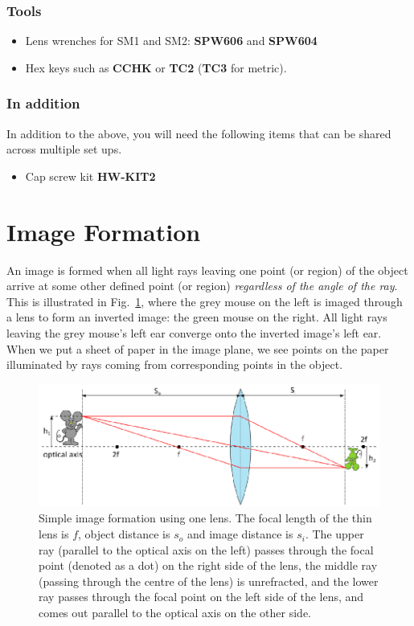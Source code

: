 \documentclass[a4paper]{report}
\begin{document}
\subsubsection{Tools}
\begin{itemize}
\setlength\itemsep{0.15em}
\item Lens wrenches for SM1 and SM2: \textbf{SPW606} and \textbf{SPW604}
\item Hex keys such as \textbf{CCHK} or \textbf{TC2} (\textbf{TC3} for metric). 
\end{itemize}

\subsubsection{In addition}
In addition to the above, you will need the following items that can be shared across multiple set ups.
\begin{itemize}
\setlength\itemsep{0.15em}
\item Cap screw kit \textbf{HW-KIT2}
\end{itemize}


\clearpage

\section{Image Formation}
An image is formed when all light rays leaving one point (or region) of the object arrive at some other defined point (or region) \textit{regardless of the angle of the ray}. 
This is illustrated in Fig.~\ref{fig:imageforming}, where the grey mouse on the left is imaged through a lens to form an inverted image: the green mouse on the right. 
All light rays leaving the grey mouse's left ear converge onto the inverted image's left ear. 
When we put a sheet of paper in the image plane, we see points on the paper illuminated by rays coming from corresponding points in the object. 



\begin{figure}[h]
\center
\includegraphics{image_forming_basics.eps}
\caption{Simple image formation using one lens. 
The focal length of the thin lens is $f$, object distance is $s_o$ and image distance is $s_i$. 
The upper ray (parallel to the optical axis on the left) passes through the focal point (denoted as a dot) on the right side of the lens, the middle ray (passing through the centre of the lens) is unrefracted, and the lower ray passes through the focal point on the left side of the lens, and comes out parallel to the optical axis on the other side. 
}
\label{fig:imageforming}
\end{figure}
\end{document}
